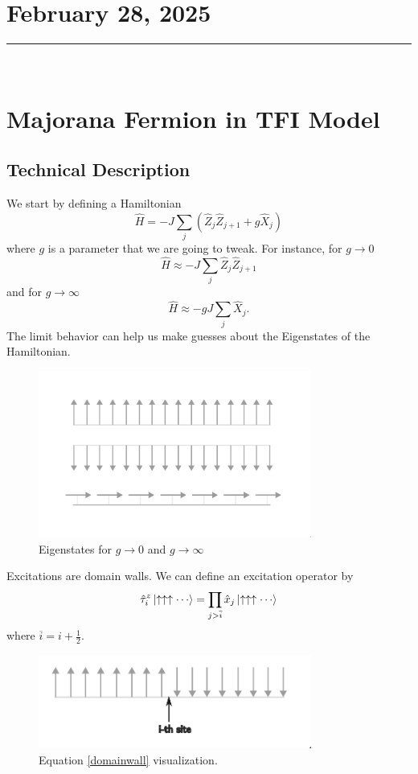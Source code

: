 \documentclass[letterpaper]{article}
\begin{document}
\section*{February 28, 2025}
\hrule 
\

\section*{Majorana Fermion in TFI Model} 


\subsection*{Technical Description}
We start by defining a Hamiltonian 
\begin{equation}
\hat{H} = 
- J \sum_{j} 
\left(
\hat Z_j \hat Z_{j+1} + g \hat X_j
\right)
\end{equation}
where $g$ is a parameter that we are going to tweak. For instance, for $g \to 0 $ 
\[
\hat H  \approx - J \sum_{j} 
\hat Z_j \hat Z_{j+1}
\]
and for $g\to \infty$ 
\[
\hat H  \approx - gJ \sum_{j} 
\hat X_j.
\]
The limit behavior can help us make guesses about the Eigenstates of the Hamiltonian.
\begin{figure}[H]
	\centering
	\includegraphics[width=0.8\textwidth]{./figures/nev1.png}
	\caption{Eigenstates for $g\to 0$ and $g\to \infty$}
	\label{fig:-figure-nev1-png}
\end{figure}

Excitations are domain walls. We can define an excitation operator by 
\begin{equation}
	\label{domainwall}
\hat{\tau}_i ^{z} 
\ket{ \uparrow \uparrow \uparrow \cdots}
=
\prod_{j > \overline{i}} \hat{x}_j
\ket{ \uparrow \uparrow \uparrow \cdots}
\end{equation}
where $\overline{i} = i + \frac{1}{2}$. 
\begin{figure}[H]
	\centering
	\includegraphics[width=0.8\textwidth]{./figures/nev2.png}
	\caption{Equation \ref{domainwall} visualization.}
	\label{fig:-figures-nev2-png}
\end{figure}
\end{document}
